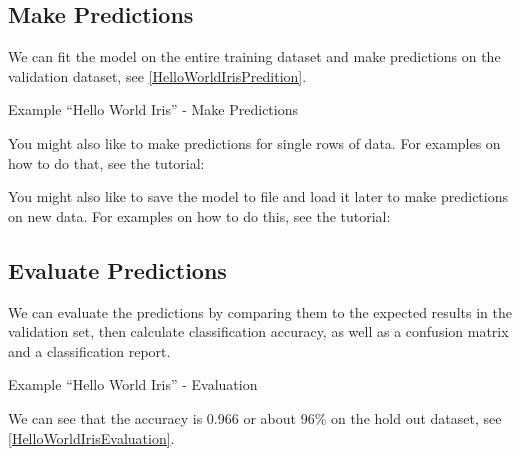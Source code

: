     
\subsection{Make Predictions}

We can fit the model on the entire training dataset and make predictions on the validation dataset, see \ref{HelloWorldIrisPredition}.

\begin{code}
        
    
    \caption{Example ``Hello World Iris'' - Make Predictions}\label{HelloWorldIrisPredition}
\end{code}      
    

You might also like to make predictions for single rows of data. For examples on how to do that, see the tutorial:

\medskip
    

\medskip

You might also like to save the model to file and load it later to make predictions on new data. For examples on how to do this, see the tutorial:
    
\medskip

    
\subsection{Evaluate Predictions}

We can evaluate the predictions by comparing them to the expected results in the validation set, then calculate classification accuracy, as well as a confusion matrix and a classification report.
    
\begin{code}
        
    
    \caption{Example ``Hello World Iris'' - Evaluation}\label{HelloWorldIrisEvaluation}
\end{code}      
    
We can see that the accuracy is 0.966 or about 96\% on the hold out dataset, see \ref{HelloWorldIrisEvaluation}.
    
